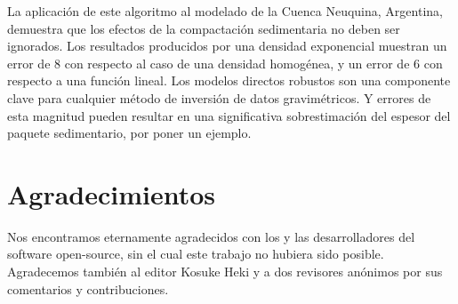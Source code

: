 La aplicación de este algoritmo al modelado de la Cuenca Neuquina, Argentina,
demuestra que los efectos de la compactación sedimentaria no deben ser
ignorados.
Los resultados producidos por una densidad exponencial muestran un error de
8\mGal{} con respecto al caso de una densidad homogénea, y un error de 6\mGal{}
con respecto a una función lineal.
Los modelos directos robustos son una componente clave para cualquier método de
inversión de datos gravimétricos.
Y errores de esta magnitud pueden resultar en una significativa sobrestimación
del espesor del paquete sedimentario, por poner un ejemplo.




\section{Agradecimientos}

Nos encontramos eternamente agradecidos con los y las desarrolladores del
software open-source, sin el cual este trabajo no hubiera sido posible.
Agradecemos también al editor Kosuke Heki y a dos revisores anónimos por sus
comentarios y contribuciones.
